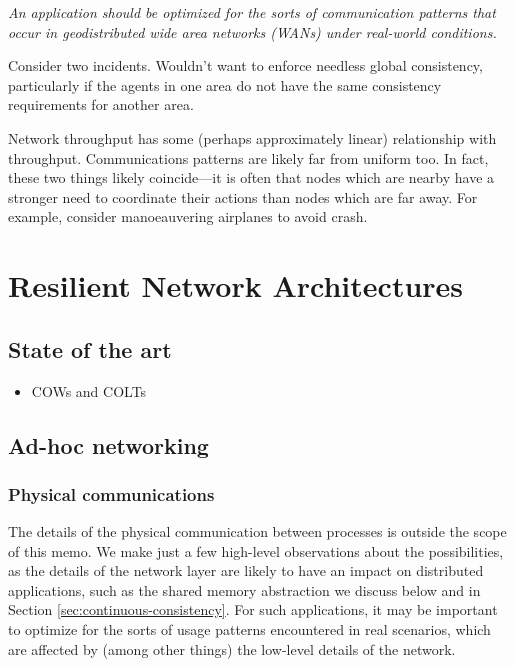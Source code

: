 \documentclass[]             %
{NASA}                       %
\theoremstyle{definition}
\providecommand{\tightlist}{%
  \setlength{\itemsep}{0pt}\setlength{\parskip}{0pt}}
\begin{document}
\emph{An application should be optimized for the sorts of
communication patterns that occur in geodistributed wide area networks
(WANs) under real-world conditions.}

Consider two incidents. Wouldn't want to enforce needless global
consistency, particularly if the agents in one area do not have the same
consistency requirements for another area.

Network throughput has some (perhaps approximately linear) relationship
with throughput. Communications patterns are likely far from uniform
too. In fact, these two things likely coincide---it is often that nodes
which are nearby have a stronger need to coordinate their actions than
nodes which are far away. For example, consider manoeauvering airplanes
to avoid crash.

\newpage

\hypertarget{resilient-network-architectures}{%
  \section{Resilient Network
    Architectures}\label{resilient-network-architectures}}

\label{sec:networking}

\hypertarget{state-of-the-art}{%
  \subsection{State of the art}\label{state-of-the-art}}

\begin{itemize}
  \tightlist
\item
  COWs and COLTs
\end{itemize}

\hypertarget{ad-hoc-networking}{%
  \subsection{Ad-hoc networking}\label{ad-hoc-networking}}

\hypertarget{physical-communications}{%
  \subsubsection{Physical communications}\label{physical-communications}}

The details of the physical communication between processes is outside
the scope of this memo. We make just a few high-level observations about
the possibilities, as the details of the network layer are likely to
have an impact on distributed applications, such as the shared memory
abstraction we discuss below and in Section
\ref{sec:continuous-consistency}. For such applications, it may be
important to optimize for the sorts of usage patterns encountered in
real scenarios, which are affected by (among other things) the low-level
details of the network.
\end{document}
